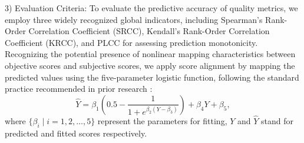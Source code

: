 3) Evaluation Criteria:
To evaluate the predictive accuracy of quality metrics, we employ three widely recognized global indicators, including Spearman’s Rank-Order Correlation Coefficient (SRCC), Kendall’s Rank-Order Correlation Coefficient (KRCC), and PLCC for assessing prediction monotonicity. Recognizing the potential presence of nonlinear mapping characteristics between objective scores and subjective scores, we apply score alignment by mapping the predicted values using the five-parameter logistic function, following the standard practice recommended in prior research \cite{sheikh2006statistical}:
\begin{equation}
\hat{Y}=\beta_{1}\left(0.5-\frac{1}{1+e^{\beta_{2}\left(Y-\beta_{3}\right)}}\right)+\beta_{4} Y+\beta_{5},
\end{equation}
where $\{\beta_{i} \mid i=1,2, \ldots, 5\}$ represent the parameters for fitting, $Y$ and $\hat{Y}$ stand for predicted and fitted scores respectively.



